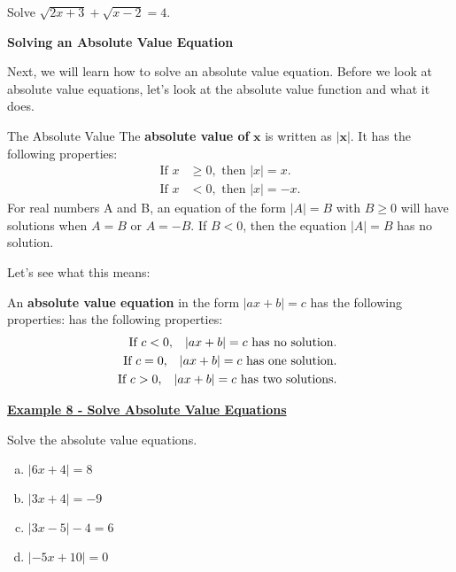 \documentclass[12pt]{book}
\begin{document}
Solve $\sqrt{2x+3} + \sqrt{x-2}= 4$.

\newpage
{\large \textbf{Solving an Absolute Value Equation}}

Next, we will learn how to solve an absolute value equation. Before we look at absolute value equations, let's look at the absolute value function and what it does. 
\vspace{3mm}
\begin{boxR}
The Absolute Value
    \vspace{1mm}
    \hline
    \vspace{2mm}
    The \textbf{absolute value of} $\mathbf{x}$ is written as $\mathbf{|x|}$. It has the following properties: 
\begin{align*}
    \text{If } x &\geq 0, \text{ then } |x| = x. \\
    \text{If } x &< 0, \text{ then } |x| = -x.
\end{align*}
For real numbers A and B, an equation of the form $|A|=B$ with $B \geq 0$ will have solutions when $A=B$ or $A=-B$. If $B < 0$, then the equation $|A|=B$ has no solution. 
  

\end{boxR}
Let's see what this means:

\vspace{40mm}
\begin{boxR}
    

An \textbf{absolute value equation} in the form $|ax+b|=c$ has the following properties:
  has the following properties:
\begin{align*}
    \text{If } c<0, \hspace{3mm} |ax+b| = c \text{ has no solution. }  \\
    \text{If } c=0, \hspace{3mm} |ax+b| = c \text{ has one solution. }  \\
    \text{If } c>0, \hspace{3mm} |ax+b| = c \text{ has two solutions. } 
\end{align*}
\end{boxR}

\newpage
\underline{\textbf{Example 8 - Solve Absolute Value Equations}}
\vspace{1mm}

Solve the absolute value equations.

  \begin{enumerate}[(a)]
    \item $|6x+4|=8$
    \vspace{60mm}
    \item $|3x+4|=-9$ 
    \vspace{30mm}
    \item $|3x-5|-4=6$
    \vspace{60mm}
    \item $|-5x+10|=0$
    \vspace{20mm}
    \end{enumerate}
\end{document}
